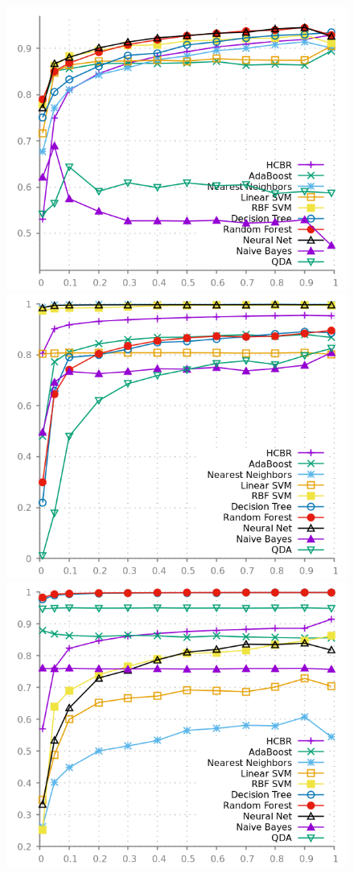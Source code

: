 \documentclass[preprint,12pt]{elsarticle}
\theoremstyle{definition}
\begin{document}
\begin{figure}[!h]
\hfill
\includegraphics[scale=0.2]{img/mcc_by_examples_phishing.png}
\hfill
\includegraphics[scale=0.2]{img/mcc_by_examples_skin.png}
\hfill
\includegraphics[scale=0.2]{img/mcc_by_examples_splice.png}

\end{figure}
\end{document}
